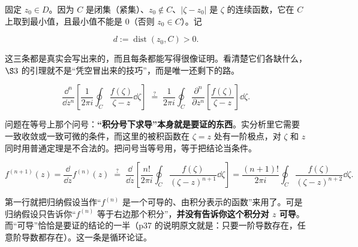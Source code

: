 \documentclass[11pt]{ctexart}
\let\origsubhdr\subhdr
\renewcommand{\subhdr}[1]{\par\origsubhdr{#1}}
\begin{document}

固定 $z_0\in D$。因为 $C$ 是闭集（紧集）、$z_0\notin C$、$|\zeta-z_0|$ 是 $\zeta$ 的连续函数，它在 $C$ 上取到最小值，且最小值不能是 $0$（否则 $z_0\in C$）。记

\begin{equation}
d:=\operatorname{dist}(z_0,C)>0 .
\tag{1.3}
\end{equation}



这三条都是真实会写出来的，而且每条都能写得很像证明。看清楚它们各缺什么，$\S3$ 的引理就不是“凭空冒出来的技巧”，而是唯一还剩下的路。


\begin{equation*}
\frac{\dd^n}{\dd z^n}\left[\frac{1}{2\pi i}\oint_C\frac{f(\zeta)}{\zeta-z}\dd\zeta\right]
\;\overset{?}{=}\;\frac{1}{2\pi i}\oint_C\frac{\partial^n}{\partial z^n}\left[\frac{f(\zeta)}{\zeta-z}\right]\dd\zeta .
\end{equation*}

问题在等号上那个问号：\textbf{“积分号下求导”本身就是要证的东西}。实分析里它需要一致收敛或一致可微的条件，而这里的被积函数在 $\zeta=z$ 处有一阶极点，对 $\zeta$ 和 $z$ 同时用普通定理是不合法的。把问号当等号用，等于把结论当条件。


\begin{equation*}
f^{(n+1)}(z)=\frac{\dd}{\dd z}f^{(n)}(z)
\;\overset{?}{=}\;\frac{\dd}{\dd z}\left[\frac{n!}{2\pi i}\oint_C\frac{f(\zeta)}{(\zeta-z)^{n+1}}\dd\zeta\right]
=\frac{(n+1)!}{2\pi i}\oint_C\frac{f(\zeta)}{(\zeta-z)^{n+2}}\dd\zeta .
\end{equation*}

第一行就把归纳假设当作“$f^{(n)}$ 是一个可导的、由积分表示的函数”来用了。可是归纳假设只告诉你“$f^{(n)}$ 等于右边那个积分”，\textbf{并没有告诉你这个积分对 $z$ 可导}。而“可导”恰恰是要证的结论的一半（p37 的说明原文就是：只要一阶导数存在，任意阶导数都存在）。这一条是循环论证。
\end{document}
